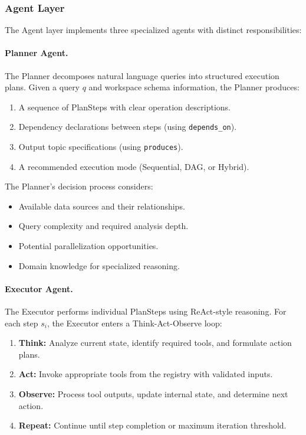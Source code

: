 \documentclass{article}
\theoremstyle{definition}
\begin{document}
\subsubsection{Agent Layer}

The Agent layer implements three specialized agents with distinct responsibilities:

\paragraph{Planner Agent.}
The Planner decomposes natural language queries into structured execution plans. Given a query $q$ and workspace schema information, the Planner produces:
\begin{enumerate}[leftmargin=1.5em]
    \item A sequence of PlanSteps with clear operation descriptions.
    \item Dependency declarations between steps (using \texttt{depends\_on}).
    \item Output topic specifications (using \texttt{produces}).
    \item A recommended execution mode (Sequential, DAG, or Hybrid).
\end{enumerate}

The Planner's decision process considers:
\begin{itemize}[leftmargin=1.5em]
    \item Available data sources and their relationships.
    \item Query complexity and required analysis depth.
    \item Potential parallelization opportunities.
    \item Domain knowledge for specialized reasoning.
\end{itemize}

\paragraph{Executor Agent.}
The Executor performs individual PlanSteps using ReAct-style reasoning. For each step $s_i$, the Executor enters a Think-Act-Observe loop:

\begin{enumerate}[leftmargin=1.5em]
    \item \textbf{Think:} Analyze current state, identify required tools, and formulate action plans.
    \item \textbf{Act:} Invoke appropriate tools from the registry with validated inputs.
    \item \textbf{Observe:} Process tool outputs, update internal state, and determine next action.
    \item \textbf{Repeat:} Continue until step completion or maximum iteration threshold.
\end{enumerate}
\end{document}
